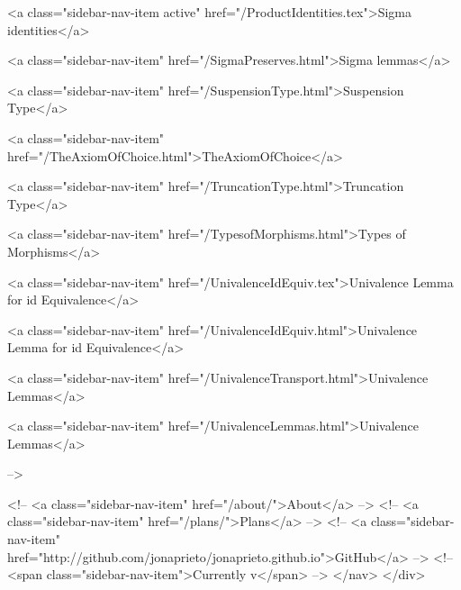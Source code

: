       
    
      
        
          <a class="sidebar-nav-item active" href="/ProductIdentities.tex">Sigma identities</a>
        
      
    
      
        
          <a class="sidebar-nav-item" href="/SigmaPreserves.html">Sigma lemmas</a>
        
      
    
      
        
          <a class="sidebar-nav-item" href="/SuspensionType.html">Suspension Type</a>
        
      
    
      
        
          <a class="sidebar-nav-item" href="/TheAxiomOfChoice.html">TheAxiomOfChoice</a>
        
      
    
      
        
          <a class="sidebar-nav-item" href="/TruncationType.html">Truncation Type</a>
        
      
    
      
        
          <a class="sidebar-nav-item" href="/TypesofMorphisms.html">Types of Morphisms</a>
        
      
    
      
        
          <a class="sidebar-nav-item" href="/UnivalenceIdEquiv.tex">Univalence Lemma for id Equivalence</a>
        
      
    
      
        
          <a class="sidebar-nav-item" href="/UnivalenceIdEquiv.html">Univalence Lemma for id Equivalence</a>
        
      
    
      
        
          <a class="sidebar-nav-item" href="/UnivalenceTransport.html">Univalence Lemmas</a>
        
      
    
      
        
          <a class="sidebar-nav-item" href="/UnivalenceLemmas.html">Univalence Lemmas</a>
        
      
     -->

    <!-- <a class="sidebar-nav-item" href="/about/">About</a> -->
    <!-- <a class="sidebar-nav-item" href="/plans/">Plans</a> -->
    <!-- <a class="sidebar-nav-item" href="http://github.com/jonaprieto/jonaprieto.github.io">GitHub</a> -->
    <!-- <span class="sidebar-nav-item">Currently v</span> -->
  </nav>
</div>

